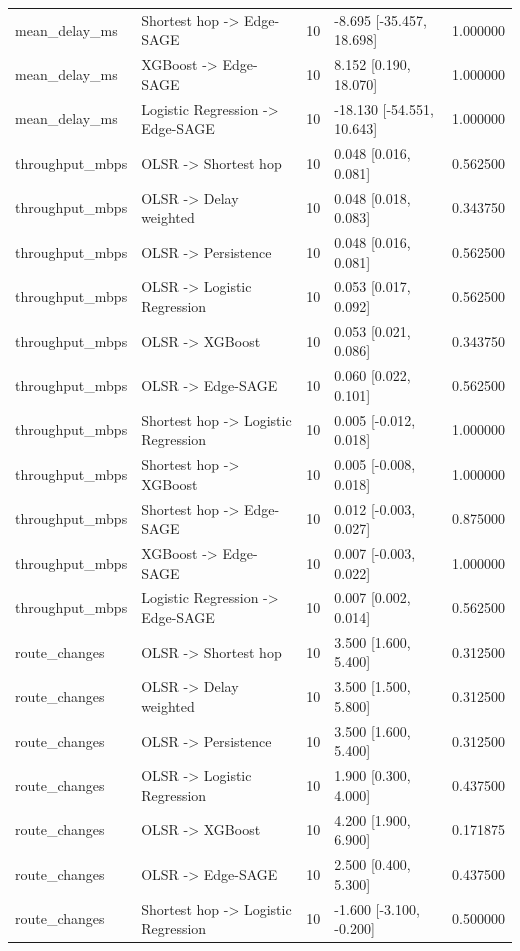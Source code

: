 \begin{table}[tb]
\begin{tabular}{llrlr}
mean\_delay\_ms & Shortest hop -> Edge-SAGE & 10 & -8.695 [-35.457, 18.698] & 1.000000 \\
mean\_delay\_ms & XGBoost -> Edge-SAGE & 10 & 8.152 [0.190, 18.070] & 1.000000 \\
mean\_delay\_ms & Logistic Regression -> Edge-SAGE & 10 & -18.130 [-54.551, 10.643] & 1.000000 \\
throughput\_mbps & OLSR -> Shortest hop & 10 & 0.048 [0.016, 0.081] & 0.562500 \\
throughput\_mbps & OLSR -> Delay weighted & 10 & 0.048 [0.018, 0.083] & 0.343750 \\
throughput\_mbps & OLSR -> Persistence & 10 & 0.048 [0.016, 0.081] & 0.562500 \\
throughput\_mbps & OLSR -> Logistic Regression & 10 & 0.053 [0.017, 0.092] & 0.562500 \\
throughput\_mbps & OLSR -> XGBoost & 10 & 0.053 [0.021, 0.086] & 0.343750 \\
throughput\_mbps & OLSR -> Edge-SAGE & 10 & 0.060 [0.022, 0.101] & 0.562500 \\
throughput\_mbps & Shortest hop -> Logistic Regression & 10 & 0.005 [-0.012, 0.018] & 1.000000 \\
throughput\_mbps & Shortest hop -> XGBoost & 10 & 0.005 [-0.008, 0.018] & 1.000000 \\
throughput\_mbps & Shortest hop -> Edge-SAGE & 10 & 0.012 [-0.003, 0.027] & 0.875000 \\
throughput\_mbps & XGBoost -> Edge-SAGE & 10 & 0.007 [-0.003, 0.022] & 1.000000 \\
throughput\_mbps & Logistic Regression -> Edge-SAGE & 10 & 0.007 [0.002, 0.014] & 0.562500 \\
route\_changes & OLSR -> Shortest hop & 10 & 3.500 [1.600, 5.400] & 0.312500 \\
route\_changes & OLSR -> Delay weighted & 10 & 3.500 [1.500, 5.800] & 0.312500 \\
route\_changes & OLSR -> Persistence & 10 & 3.500 [1.600, 5.400] & 0.312500 \\
route\_changes & OLSR -> Logistic Regression & 10 & 1.900 [0.300, 4.000] & 0.437500 \\
route\_changes & OLSR -> XGBoost & 10 & 4.200 [1.900, 6.900] & 0.171875 \\
route\_changes & OLSR -> Edge-SAGE & 10 & 2.500 [0.400, 5.300] & 0.437500 \\
route\_changes & Shortest hop -> Logistic Regression & 10 & -1.600 [-3.100, -0.200] & 0.500000 \\

\end{tabular}
\end{table}
